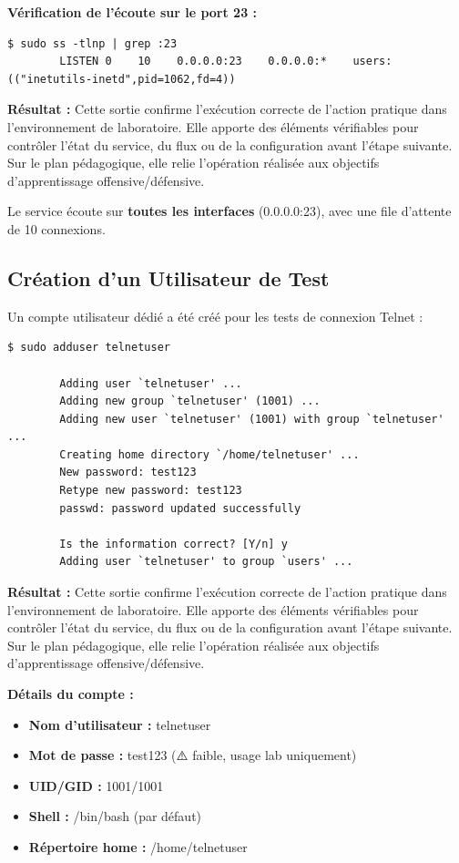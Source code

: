 \documentclass[12pt,a4paper,openany]{report}
\begin{document}
	
	\textbf{Vérification de l'écoute sur le port 23 :}
	\begin{lstlisting}[caption=Vérification du port Telnet]
		$ sudo ss -tlnp | grep :23
		LISTEN 0    10    0.0.0.0:23    0.0.0.0:*    users:(("inetutils-inetd",pid=1062,fd=4))
	\end{lstlisting}
	
	\textbf{Résultat :} Cette sortie confirme l'exécution correcte de l'action pratique dans l'environnement de laboratoire. Elle apporte des éléments vérifiables pour contrôler l'état du service, du flux ou de la configuration avant l'étape suivante. Sur le plan pédagogique, elle relie l'opération réalisée aux objectifs d'apprentissage offensive/défensive.
	
	
	\textcolor{green}{\checkmark} Le service écoute sur \textbf{toutes les interfaces} (0.0.0.0:23), avec une file d'attente de 10 connexions.
	
	\subsection{Création d'un Utilisateur de Test}
	Un compte utilisateur dédié a été créé pour les tests de connexion Telnet :
	
	\begin{lstlisting}[caption=Création de l'utilisateur telnetuser]
		$ sudo adduser telnetuser
		
		Adding user `telnetuser' ...
		Adding new group `telnetuser' (1001) ...
		Adding new user `telnetuser' (1001) with group `telnetuser' ...
		Creating home directory `/home/telnetuser' ...
		New password: test123
		Retype new password: test123
		passwd: password updated successfully
		
		Is the information correct? [Y/n] y
		Adding user `telnetuser' to group `users' ...
	\end{lstlisting}
	
	\textbf{Résultat :} Cette sortie confirme l'exécution correcte de l'action pratique dans l'environnement de laboratoire. Elle apporte des éléments vérifiables pour contrôler l'état du service, du flux ou de la configuration avant l'étape suivante. Sur le plan pédagogique, elle relie l'opération réalisée aux objectifs d'apprentissage offensive/défensive.
	
	
	\textbf{Détails du compte :}
	\begin{itemize}
		\item \textbf{Nom d'utilisateur :} telnetuser
		\item \textbf{Mot de passe :} test123 (⚠️ faible, usage lab uniquement)
		\item \textbf{UID/GID :} 1001/1001
		\item \textbf{Shell :} /bin/bash (par défaut)
		\item \textbf{Répertoire home :} /home/telnetuser
	\end{itemize}
	
\end{document}
